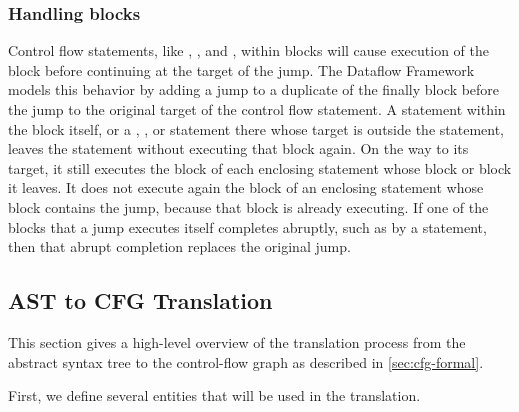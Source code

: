 
\subsubsection{Handling  blocks}
\label{sec:try-finally}

Control flow statements, like , , and ,
within  blocks will cause execution of the  block before
continuing at the target of the jump. The Dataflow Framework models this
behavior by adding a jump to a duplicate of the finally block before the
jump to the original target of the control flow statement.
A  statement within the  block itself, or a
, , or  statement there whose target
is outside the  statement, leaves the  statement without
executing that  block again.  On the way to its target, it still
executes the  block of each enclosing  statement whose
 block or  block it leaves.  It does not execute again the
 block of an enclosing  statement whose 
block contains the jump, because that  block is already executing.
If one of the  blocks that a jump executes itself completes
abruptly, such as by a  statement, then that abrupt completion
replaces the original jump.


\subsection{AST to CFG Translation}
\label{sec:ast_to_cfg_translation}

This section gives a high-level overview of the translation process
from the abstract syntax tree to the control-flow graph as described
in \autoref{sec:cfg-formal}.

First, we define several entities that will be used in the translation.

